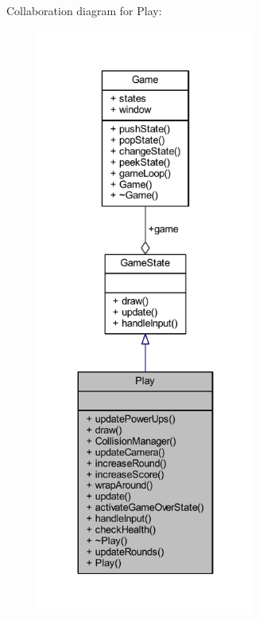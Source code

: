 Collaboration diagram for Play\+:
\nopagebreak
\begin{figure}[H]
\begin{center}
\leavevmode
\includegraphics[height=550pt]{class_play__coll__graph}
\end{center}
\end{figure}
